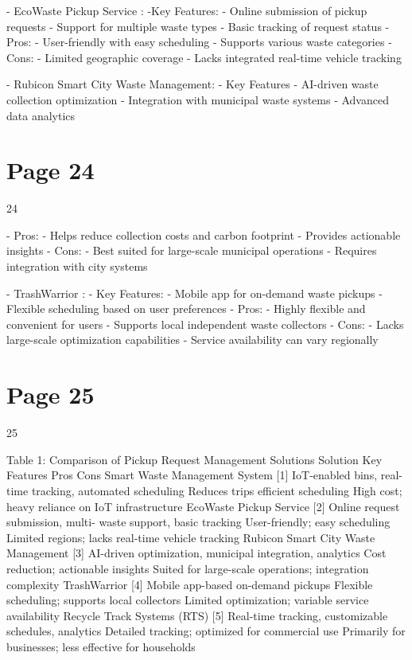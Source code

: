 \documentclass{article}
\begin{document}
- EcoWaste Pickup Service : 
  -Key Features: 
    - Online submission of pickup requests   
    - Support for multiple waste types   
    - Basic tracking of request status   
  - Pros: 
    - User-friendly with easy scheduling   
    - Supports various waste categories   
  - Cons:  
    - Limited geographic coverage   
    - Lacks integrated real-time vehicle tracking 
 
- Rubicon Smart City Waste Management: 
  - Key Features 
    - AI-driven waste collection optimization   
    - Integration with municipal waste systems   
    - Advanced data analytics   

\section*{Page 24}
   
 
 24  
 
  - Pros: 
    - Helps reduce collection costs and carbon footprint   
    - Provides actionable insights   
  - Cons: 
    - Best suited for large-scale municipal operations   
    - Requires integration with city systems 
 
- TrashWarrior : 
  - Key Features: 
    - Mobile app for on-demand waste pickups   
    - Flexible scheduling based on user preferences   
  - Pros: 
    - Highly flexible and convenient for users   
    - Supports local independent waste collectors   
  - Cons: 
    - Lacks large-scale optimization capabilities   
    - Service availability can vary regionally 
 
 
 
 
 
 
 
 
 
 
 

\section*{Page 25}
   
 
 25  
 
Table 1: Comparison of Pickup Request Management Solutions 
Solution                        Key Features                                           Pros                                             Cons 
Smart Waste 
Management System 
[1] 
IoT-enabled bins, 
real-time tracking, 
automated 
scheduling 
Reduces trips 
efficient scheduling 
High cost; heavy 
reliance on IoT 
infrastructure 
EcoWaste Pickup 
Service [2] 
Online request 
submission, multi-
waste support, basic 
tracking 
User-friendly; easy 
scheduling 
Limited regions; lacks 
real-time vehicle 
tracking 
Rubicon Smart City 
Waste Management 
[3] 
AI-driven 
optimization, 
municipal 
integration, analytics 
Cost reduction; 
actionable insights 
Suited for large-scale 
operations; 
integration 
complexity 
TrashWarrior [4] Mobile app-based 
on-demand pickups 
Flexible scheduling; 
supports local 
collectors 
Limited optimization; 
variable service 
availability 
Recycle Track 
Systems (RTS) [5] 
Real-time tracking, 
customizable 
schedules, analytics 
Detailed tracking; 
optimized for 
commercial use 
Primarily for 
businesses; less 
effective for 
households 
 
\end{document}
